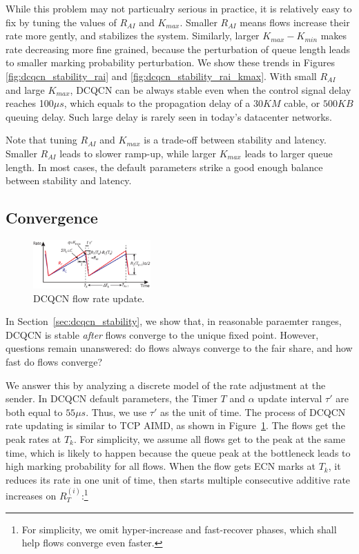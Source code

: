 While this problem may not particualry serious in practice, it is relatively
easy to fix by tuning the values of $R_{AI}$ and $K_{max}$.  Smaller $R_{AI}$
means flows increase their rate more gently, and stabilizes the system.
Similarly, larger $K_{max} - K_{min}$ makes rate decreasing more fine grained,
because the perturbation of queue length leads to smaller marking probability
perturbation. We show these trends in Figures \ref{fig:dcqcn_stability_rai} and
\ref{fig:dcqcn_stability_rai_kmax}.  With small $R_{AI}$ and large $K_{max}$,
DCQCN can be always stable even when the control signal delay reaches 100$\mu
s$, which equals to the propagation delay of a $30KM$ cable, or $500KB$ queuing
delay. Such large delay is rarely seen in today's datacenter networks. 

Note that tuning $R_{AI}$ and $K_{max}$ is a trade-off between stability and
latency. Smaller $R_{AI}$ leads to slower ramp-up, while larger $K_{max}$ leads
to larger queue length. In most cases, the default parameters strike a good
enough balance between stability and latency.

\subsection{Convergence}

\begin{figure}[t]
\center
\includegraphics[width=0.4\textwidth]{figures/dcqcn_convergence.eps}
\caption{DCQCN flow rate update.}
\label{fig:dcqcn_convergence}
\end{figure}

In Section~\ref{sec:dcqcn_stability}, we show that, in reasonable paraemter ranges, 
DCQCN is stable {\em after} flows converge to the unique fixed point. However,
questions remain unanswered: do flows always converge to the fair share, and how fast
do flows converge? 

We answer this by analyzing a discrete model of the rate adjustment at the sender. In
DCQCN default parameters, the Timer $T$ and $\alpha$ update interval $\tau '$ are both 
equal to $55\mu s$. Thus, we use $\tau '$ as the unit of time. The process of DCQCN
rate updating is similar to TCP AIMD, as shown in Figure~\ref{fig:dcqcn_convergence}.
The flows get the peak rates at $T_k$. For simplicity, we assume all flows get to the peak
at the same time, which is likely to happen because the queue peak at the bottleneck 
leads to high marking probability for all flows. When the flow gets ECN marks at $T_k$,
it reduces its rate in one unit of time, then starts multiple consecutive additive rate 
increases on $R_T^{(i)}$:\footnote{For simplicity, we omit hyper-increase and fast-recover phases, 
which shall help flows converge even faster.}

